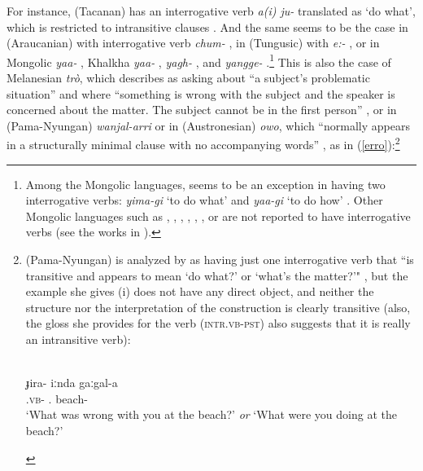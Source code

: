 \documentclass[output=paper]{langsci/langscibook}
\begin{document}
For instance,  (Tacanan) has an interrogative verb \emph{a(i) ju-}
translated as `do what', which is restricted to intransitive clauses
\citep{guillaume2008}. And the same seems to be the case in 
(Araucanian) with interrogative verb \emph{chum-}
\citep{deaugusta1903,smeets2007}, in  (Tungusic) with \emph{e:-}
\citep{Nedjalkov1997}, or in Mongolic  \emph{yaa-} \citep{skribnik2003},
Khalkha \emph{yaa-} \citep{svantesson2003},  \emph{yagh-}
\citep{blasing2003}, and  \emph{yangge-}
\citep{hugjiltu2003}.\footnote{Among the Mongolic languages,  seems
    to be an exception in having two interrogative verbs: \emph{yima-gi} `to do
    what' and \emph{yaa-gi} `to do how' \citep{nugteren2003}. Other Mongolic
    languages such as , , , , , , or
     are not reported to have interrogative verbs (see the works in
\citealt{janhunen2003}).} This is also the case of Melanesian 
\emph{tr\`o}, which \citet[229]{osumi1995} describes as asking about ``a
subject's problematic situation'' and where ``something is wrong with the
subject and the speaker is concerned about the matter.  The subject cannot be
in the first person'' \citep[233]{osumi1995}, or in  (Pama-Nyungan)
\emph{wanjal-arri} \citep{jones2011} or in  (Austronesian)
\emph{owo}, which ``normally appears in a structurally minimal clause with no
accompanying words'' \citep[238]{crowley1998}, as in
(\ref{erro}):\footnote{ (Pama-Nyungan) is analyzed by
    \citet{eades1979} as having just one interrogative verb that ``is
    transitive and appears to mean `do what?' or `what's the matter?'"
    \citep[302--303]{eades1979}, but the example she gives (i) does
    not have any direct object, and neither the structure nor the
    interpretation of the construction is clearly transitive (also, the gloss
    she provides for the verb (\textsc{intr.vb-pst}) also suggests that it is
    really an intransitive verb):

\begin{exe}
     \label{gumb} \\
    \gll ɟira-\ng{} {\ng iːnda} gaːgal-a\\
    \Intr.\textsc{vb}-\Pst{} \Ssg{}.\Aa{} beach-\Loc{}\\
\glt `What was wrong with you at the beach?' \textit{or} `What were you doing at the beach?'
\end{exe}
}
\end{document}

